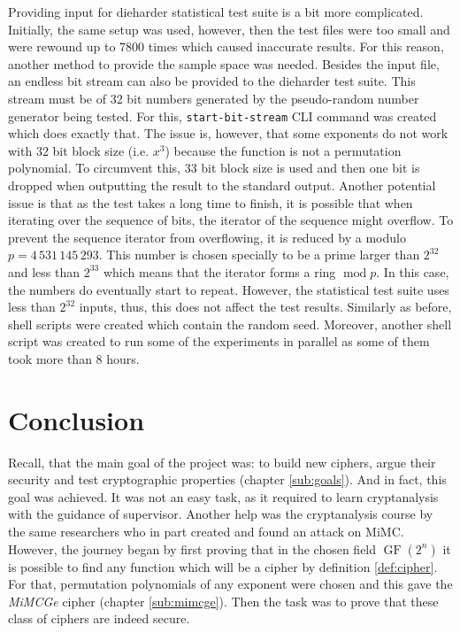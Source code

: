 \documentclass{Resources/UoBLab1}
\theoremstyle{definition}
\begin{document}
Providing input for dieharder statistical test suite is a bit more complicated. Initially, the same setup was used, however, then the test files were too small and were rewound up to 7800 times which caused inaccurate results. For this reason, another method to provide the sample space was needed. Besides the input file, an endless bit stream can also be provided to the dieharder test suite. This stream must be of 32 bit numbers generated by the pseudo-random number generator being tested. For this, \verb|start-bit-stream| CLI command was created which does exactly that. The issue is, however, that some exponents do not work with 32 bit block size (i.e. $x^3$) because the function is not a permutation polynomial. To circumvent this, 33 bit block size is used and then one bit is dropped when outputting the result to the standard output. Another potential issue is that as the test takes a long time to finish, it is possible that when iterating over the sequence of bits, the iterator of the sequence might overflow. To prevent the sequence iterator from overflowing, it is reduced by a modulo $p = 4\,531\,145\,293$. This number is chosen specially to be a prime larger than $2^{32}$ and less than $2^{33}$ which means that the iterator forms a ring $\operatorname{mod} p$. In this case, the numbers do eventually start to repeat. However, the statistical test suite uses less than $2^{32}$ inputs, thus, this does not affect the test results. Similarly as before, shell scripts were created which contain the random seed. Moreover, another shell script was created to run some of the experiments in parallel as some of them took more than 8 hours.


\section{Conclusion}
Recall, that the main goal of the project was: to build new ciphers, argue their security and test cryptographic properties (chapter \ref{sub:goals}). And in fact, this goal was achieved. It was not an easy task, as it required to learn cryptanalysis with the guidance of supervisor. Another help was the cryptanalysis course\cite{CryptanalysisCource} by the same researchers who in part created and found an attack on MiMC. However, the journey began by first proving that in the chosen field $\operatorname{GF}(2^n)$ it is possible to find any function which will be a cipher by definition \ref{def:cipher}. For that, permutation polynomials of any exponent were chosen and this gave the \textit{MiMCGe} cipher (chapter \ref{sub:mimcge}). Then the task was to prove that these class of ciphers are indeed secure.
\end{document}
